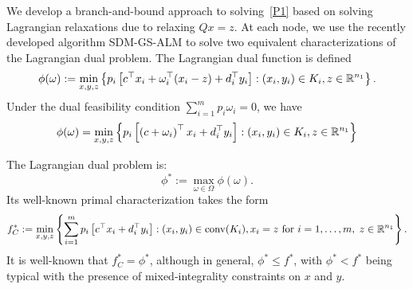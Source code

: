 We develop a branch-and-bound approach to solving~\eqref{P1} based on solving Lagrangian relaxations due to relaxing $Qx=z$.
At each node, we use the recently developed algorithm SDM-GS-ALM to solve two equivalent characterizations of the Lagrangian dual problem.
The Lagrangian dual function is defined 
$$\phi(\omega) := \min_{x,y,z} \left\{ p_i \left[ c^\top x_i + \omega_i^\top(x_i-z) + d_i^\top y_i \right] : (x_i,y_i) \in K_i, z \in \mathbb{R}^{n_1} \right \}.$$ 
Under the dual feasibility condition $\sum_{i=1}^m p_i \omega_i = 0$, we have 
$$\phi(\omega) = \min_{x,y,z} \left\{ p_i \left[ \left(c+\omega_i\right)^\top x_i + d_i^\top y_i \right] : (x_i,y_i) \in K_i, z \in \mathbb{R}^{n_1} \right \}$$ 



The Lagrangian dual problem is:
\begin{equation}\label{D1}
\phi^*:=\max_{\omega \in \Omega} \phi(\omega).
\end{equation}
Its well-known primal characterization takes the form
\begin{equation}\label{D2}
f_C^*:=\min_{x,y,z} \left\{ \sum_{i=1}^m p_i \left[ c^\top x_i + d_i^\top y_i \right] : (x_i,y_i) \in \operatorname{conv}(K_i),  x_i=z \text{ for }i=1,\dots,m,\; z \in \mathbb{R}^{n_1} \right \}.
\end{equation}
It is well-known that $f_C^*=\phi^*$, although in general, $\phi^* \le f^*$, with $\phi^* < f^*$ being typical with the presence of mixed-integrality constraints on $x$ and $y$.


